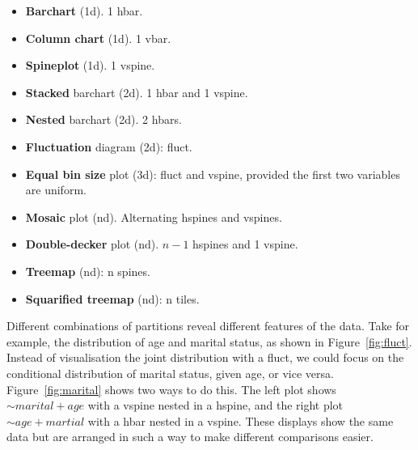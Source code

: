 \documentclass[letterpaper,oneside]{scrartcl}
\begin{document}
\begin{itemize}
  \item {\bf Barchart} (1d). 1 hbar.
  \item {\bf Column chart} (1d). 1 vbar.
  \item {\bf Spineplot} (1d). 1 vspine.

  \item {\bf Stacked} barchart (2d). 1 hbar and 1 vspine.
  \item {\bf Nested} barchart (2d).  2 hbars. \citep{peltier:2009}
  \item {\bf Fluctuation} diagram (2d): fluct. 

  \item {\bf Equal bin size} plot (3d): fluct and vspine, provided the first two variables are uniform.

  \item {\bf Mosaic} plot (nd).  Alternating hspines and vspines.  \citep{hartigan:1984,hartigan:1981,friendly:1994,hofmann:2003}
  \item {\bf Double-decker} plot (nd).  $n-1$ hspines and 1 vspine. \citep{hofmann:2001}
  \item {\bf Treemap} (nd): n spines. \citep{shneiderman:1992}
  \item {\bf Squarified treemap} (nd): n tiles. \citep{bruls:1999}
  
\end{itemize}

Different combinations of partitions reveal different features of the data. Take for example, the distribution of age and marital status, as shown in Figure~\ref{fig:fluct}. Instead of visualisation the joint distribution with a fluct, we could focus on the conditional distribution of marital status, given age, or vice versa. Figure~\ref{fig:marital} shows two ways to do this. The left plot shows $\sim marital + age$ with a vspine nested in a hspine, and the right plot $\sim age + martial$ with a hbar nested in a vspine. These displays show the same data but are arranged in such a way to make different comparisons easier.
\end{document}
